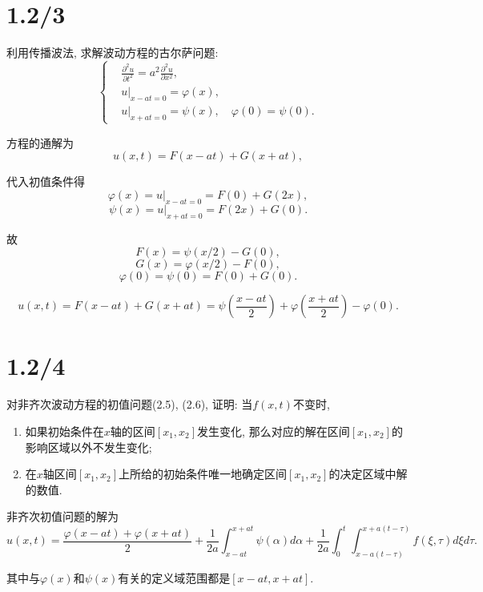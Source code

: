 \documentclass[11pt,a4paper]{article}
\author{刘逸灏 (515370910207)}
\begin{document}
\maketitle

\section{1.2/3}
\begin{problem}
利用传播波法, 求解波动方程的古尔萨问题:
$$\left\{\begin{aligned}
     & \frac{\partial^2 u}{\partial t^2}=a^2\frac{\partial^2u}{\partial x^2}, \\
     & u|_{x-at=0}=\varphi(x),                                                \\
     & u|_{x+at=0}=\psi(x),\quad \varphi(0)=\psi(0).
  \end{aligned}\right.$$
\end{problem}

方程的通解为
$$u(x,t)=F(x-at)+G(x+at),$$

代入初值条件得
$$\varphi(x)=u|_{x-at=0}=F(0)+G(2x),$$
$$\psi(x)=u|_{x+at=0}=F(2x)+G(0).$$

故
$$F(x)=\psi(x/2)-G(0),$$
$$G(x)=\varphi(x/2)-F(0),$$
$$\varphi(0)=\psi(0)=F(0)+G(0).$$

$$u(x,t)=F(x-at)+G(x+at)=\psi\left(\frac{x-at}{2}\right)+\varphi\left(\frac{x+at}{2}\right)-\varphi(0).$$

\section{1.2/4}
\begin{problem}
对非齐次波动方程的初值问题(2.5), (2.6), 证明: 当$f(x,t)$不变时,
\begin{enumerate}
  \item 如果初始条件在$x$轴的区间$[x_1,x_2]$发生变化, 那么对应的解在区间$[x_1,x_2]$的影响区域以外不发生变化;
  \item 在$x$轴区间$[x_1,x_2]$上所给的初始条件唯一地确定区间$[x_1,x_2]$的决定区域中解的数值.
\end{enumerate}
\end{problem}

非齐次初值问题的解为
$$u(x,t)=\frac{\varphi(x-at)+\varphi(x+at)}{2}+\frac{1}{2a}\int_{x-at}^{x+at}\psi(\alpha)d\alpha+\frac{1}{2a}\int_0^t\int_{x-a(t-\tau)}^{x+a(t-\tau)}f(\xi,\tau)d\xi d\tau.$$

其中与$\varphi(x)$和$\psi(x)$有关的定义域范围都是$[x-at,x+at]$.
\end{document}
